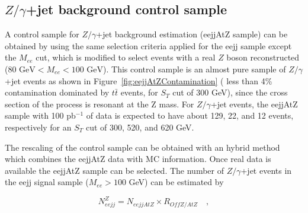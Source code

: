 \subsection{$Z/\gamma$+jet background control sample} 

A control sample for $Z/\gamma$+jet background estimation (eejjAtZ sample) 
can be obtained by using the same selection criteria applied for the eejj sample except 
the $M_{ee}$ cut, which is modified to select events with a real $Z$ boson reconstructed 
($80\mbox{ GeV} < M_{ee} < 100\mbox{ GeV}$). This control sample is an almost pure sample of  
$Z/\gamma$+jet events as shown in Figure~\ref{fig:eejjAtZContamination}   
( less than 4\% contamination dominated by $t\bar{t}$ events, for $S_{T}$ cut of 300 GeV), 
since the cross section of the process is resonant at the Z mass. 
For $Z/\gamma$+jet events, the eejjAtZ sample with 100 pb$^{-1}$ of data 
is expected to have about 129, 22, and 12 events, respectively for an $S_{T}$ cut of 300, 520, and 620 GeV.

The rescaling of the control sample can be obtained with an hybrid method which combines the eejjAtZ data with 
MC information. Once real data is available the eejjAtZ sample can be selected. 
The number of $Z/\gamma$+jet events in the eejj signal sample ($M_{ee}>100$ GeV) can be estimated by

\begin{equation} \label{formula:NeejFromNemujj}
N_{eejj}^{Z} = N_{eejjAtZ} \times R_{OffZ/AtZ} \quad , 
\end{equation}

